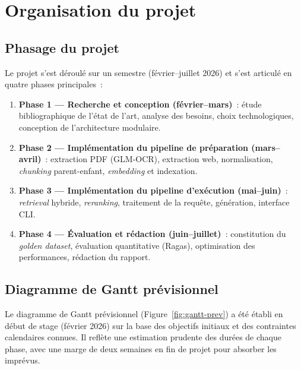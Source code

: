 \documentclass[11pt,a4paper]{article}
\begin{document}
\section{Organisation du projet}
\label{sec:organisation}

\subsection{Phasage du projet}

Le projet s'est déroulé sur un semestre (février--juillet 2026) et s'est articulé en quatre phases principales~:

\begin{enumerate}
  \item \textbf{Phase 1 --- Recherche et conception (février--mars)}~: étude bibliographique de l'état de l'art, analyse des besoins, choix technologiques, conception de l'architecture modulaire.
  \item \textbf{Phase 2 --- Implémentation du pipeline de préparation (mars--avril)}~: extraction PDF (GLM-OCR), extraction web, normalisation, \textit{chunking} parent-enfant, \textit{embedding} et indexation.
  \item \textbf{Phase 3 --- Implémentation du pipeline d'exécution (mai--juin)}~: \textit{retrieval} hybride, \textit{reranking}, traitement de la requête, génération, interface CLI.
  \item \textbf{Phase 4 --- Évaluation et rédaction (juin--juillet)}~: constitution du \textit{golden dataset}, évaluation quantitative (Ragas), optimisation des performances, rédaction du rapport.
\end{enumerate}

\subsection{Diagramme de Gantt prévisionnel}
\label{sec:gantt-previsionnel}

Le diagramme de Gantt prévisionnel (Figure~\ref{fig:gantt-prev}) a été établi en début de stage (février 2026) sur la base des objectifs initiaux et des contraintes calendaires connues. Il reflète une estimation prudente des durées de chaque phase, avec une marge de deux semaines en fin de projet pour absorber les imprévus.
\end{document}
